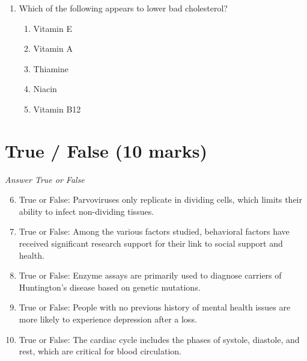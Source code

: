 \documentclass[12pt]{article}
\begin{document}
\begin{enumerate}[label=\arabic*.]
\begin{enumerate}[label=(\alph*)]
    \item parietal, squamous temporal and greater wing of the sphenoid.
    \item left and right parietal bones.
    \item parietal and sphenoid bones.
    \item frontal and occipital bones.
    \item squamous temporal and greater wing of the sphenoid.
\end{enumerate}
\item Which of the following appears to lower bad cholesterol?
\begin{enumerate}[label=(\alph*)]
    \item Vitamin E
    \item Vitamin A
    \item Thiamine
    \item Niacin
    \item Vitamin B12
\end{enumerate}
\end{enumerate}

\section*{True / False (10 marks)}
\textit{Answer True or False}
\begin{enumerate}[label=\arabic*.]
\setcounter{enumi}{5}
\item True or False: Parvoviruses only replicate in dividing cells, which limits their ability to infect non-dividing tissues.
\item True or False: Among the various factors studied, behavioral factors have received significant research support for their link to social support and health.
\item True or False: Enzyme assays are primarily used to diagnose carriers of Huntington's disease based on genetic mutations.
\item True or False: People with no previous history of mental health issues are more likely to experience depression after a loss.
\item True or False: The cardiac cycle includes the phases of systole, diastole, and rest, which are critical for blood circulation.
\end{enumerate}
\end{document}
